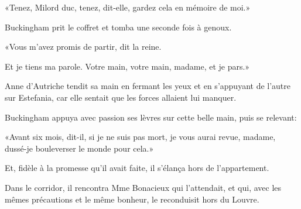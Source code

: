 «Tenez, Milord duc, tenez, dit-elle, gardez cela en mémoire de moi.» 

Buckingham prit le coffret et tomba une seconde fois à genoux. 

«Vous m'avez promis de partir, dit la reine. 

\speak  Et je tiens ma parole. Votre main, votre main, madame, et je pars.» 

Anne d'Autriche tendit sa main en fermant les yeux et en s'appuyant de l'autre sur Estefania, car elle sentait que les forces allaient lui manquer. 

Buckingham appuya avec passion ses lèvres sur cette belle main, puis se relevant: 

«Avant six mois, dit-il, si je ne suis pas mort, je vous aurai revue, madame, dussé-je bouleverser le monde pour cela.» 

Et, fidèle à la promesse qu'il avait faite, il s'élança hors de l'appartement. 

Dans le corridor, il rencontra Mme Bonacieux qui l'attendait, et qui, avec les mêmes précautions et le même bonheur, le reconduisit hors du Louvre.